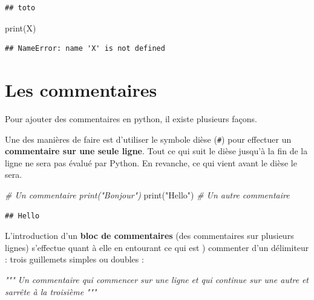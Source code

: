 \documentclass[
  12pt,
]{book}
\newenvironment{Shaded}{\begin{snugshade}}{\end{snugshade}}
\newcommand{\BuiltInTok}[1]{#1}
\newcommand{\CommentTok}[1]{\textcolor[rgb]{0.56,0.35,0.01}{\textit{#1}}}
\newcommand{\NormalTok}[1]{#1}
\newcommand{\StringTok}[1]{\textcolor[rgb]{0.31,0.60,0.02}{#1}}
\numberwithin{equation}{section}
\numberwithin{countremarque}{section}
\begin{document}
\begin{lstlisting}
## toto
\end{lstlisting}

\begin{Shaded}
\begin{Highlighting}[]
\BuiltInTok{print}\NormalTok{(X)}
\end{Highlighting}
\end{Shaded}

\begin{lstlisting}
## NameError: name 'X' is not defined
\end{lstlisting}

\section{Les commentaires}\label{les-commentaires}

Pour ajouter des commentaires en python, il existe plusieurs façons.

Une des manières de faire est d'utiliser le symbole dièse (\texttt{\#}) pour effectuer un \textbf{commentaire sur une seule ligne}. Tout ce qui suit le dièse jusqu'à la fin de la ligne ne sera pas évalué par Python. En revanche, ce qui vient avant le dièse le sera.

\begin{Shaded}
\begin{Highlighting}[]
\CommentTok{\# Un commentaire print("Bonjour")}
\BuiltInTok{print}\NormalTok{(}\StringTok{"Hello"}\NormalTok{) }\CommentTok{\# Un autre commentaire}
\end{Highlighting}
\end{Shaded}

\begin{lstlisting}
## Hello
\end{lstlisting}

L'introduction d'un \textbf{bloc de commentaires} (des commentaires sur plusieurs lignes) s'effectue quant à elle en entourant ce qui est ) commenter d'un délimiteur : trois guillemets simples ou doubles :

\begin{Shaded}
\begin{Highlighting}[]
\CommentTok{"""}
\CommentTok{Un commentaire qui commencer sur une ligne}
\CommentTok{et qui continue sur une autre}
\CommentTok{et s\textquotesingle{}arrête à la troisième}
\CommentTok{"""}
\end{Highlighting}
\end{Shaded}
\end{document}
